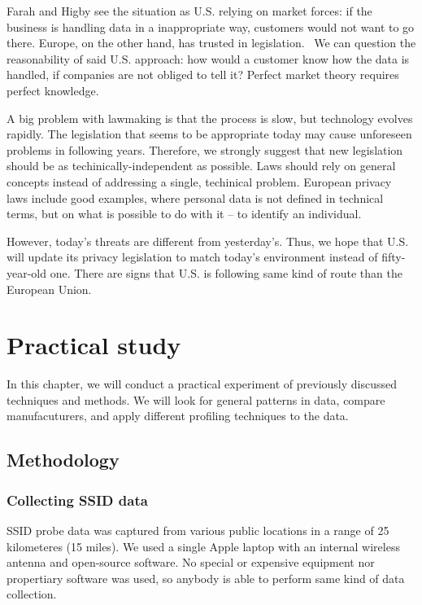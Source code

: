\documentclass[12pt,a4paper,oneside,pdftex]{report}
\begin{document}
Farah and Higby see the situation as U.S. relying on market forces: if the business is handling data in a inappropriate way, customers would not want to go there. Europe, on the other hand, has trusted in legislation.~\cite{farah2001commerce} We can question the reasonability of said U.S. approach: how would a customer know how the data is handled, if companies are not obliged to tell it? Perfect market theory requires perfect knowledge.

A big problem with lawmaking is that the process is slow, but technology evolves rapidly. The legislation that seems to be appropriate today may cause unforeseen problems in following years. Therefore, we strongly suggest that new legislation should be as techinically-independent as possible. Laws should rely on general concepts instead of addressing a single, techinical problem. European privacy laws include good examples, where personal data is not defined in technical terms, but on what is possible to do with it -- to identify an individual.

However, today's threats are different from yesterday's. Thus, we hope that U.S. will update its privacy legislation to match today's environment instead of fifty-year-old one. There are signs that U.S. is following same kind of route than the European Union.



\chapter{Practical study}
\label{chapter:practical}

In this chapter, we will conduct a practical experiment of previously discussed techniques and methods. We will look for general patterns in data, compare manufacuturers, and apply different profiling techniques to the data. 

\section{Methodology}
\label{sec:methods}

\subsection{Collecting SSID data}

SSID probe data was captured from various public locations in a range of 25 kilometeres (15 miles). We used a single Apple laptop with an internal wireless antenna and open-source software. No special or expensive equipment nor propertiary software was used, so anybody is able to perform same kind of data collection.
\end{document}

